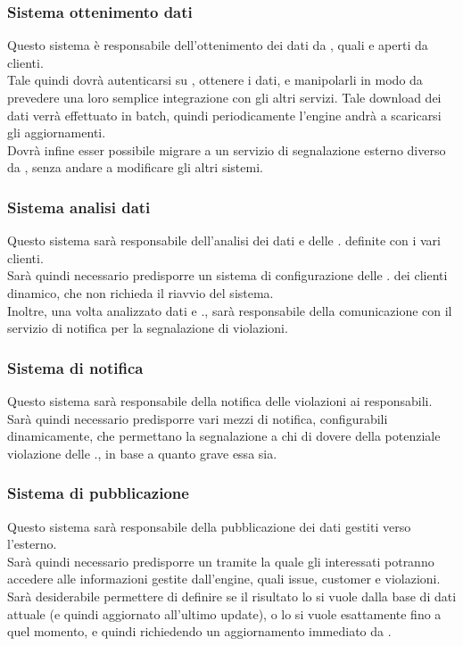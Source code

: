 		\subsubsection{Sistema ottenimento dati} 
			Questo sistema è responsabile dell'ottenimento dei dati da , quali  e  aperti da clienti. \\
			Tale quindi dovrà autenticarsi su , ottenere i dati, e manipolarli in modo da prevedere una loro semplice integrazione con gli altri servizi.
			Tale download dei dati verrà effettuato in batch, quindi periodicamente l'engine andrà a scaricarsi gli aggiornamenti. \\
			Dovrà infine esser possibile migrare a un servizio di segnalazione esterno diverso da , senza andare a modificare gli altri sistemi.
		\subsubsection{Sistema analisi dati}
			Questo sistema sarà responsabile dell'analisi dei dati e delle . definite con i vari clienti. \\
			Sarà quindi necessario predisporre un sistema di configurazione delle . dei clienti dinamico, che non richieda il riavvio del sistema. \\
			Inoltre, una volta analizzato dati e ., sarà responsabile  della comunicazione con il servizio di notifica per la segnalazione di violazioni.
		\subsubsection{Sistema di notifica}
			Questo sistema sarà responsabile della notifica delle violazioni ai responsabili.\\
			Sarà quindi necessario predisporre vari mezzi di notifica, configurabili dinamicamente, che permettano la segnalazione a chi di dovere della potenziale violazione delle ., in base a quanto grave essa sia.
		\subsubsection{Sistema di pubblicazione}
			Questo sistema sarà responsabile della pubblicazione dei dati gestiti verso l'esterno.\\
			Sarà quindi necessario predisporre un  tramite la quale gli interessati potranno accedere alle informazioni gestite dall'engine, quali issue, customer e violazioni. \\
			Sarà desiderabile permettere di definire se il risultato lo si vuole dalla base di dati attuale (e quindi aggiornato all'ultimo update), o lo si vuole esattamente fino a quel momento, e quindi richiedendo un aggiornamento immediato da .
		






